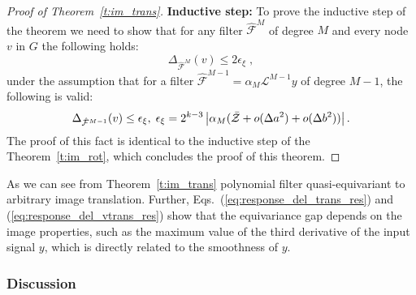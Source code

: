 \documentclass[10pt,journal,compsoc]{IEEEtran}
\newcommand{\renata}[1]{\textcolor{black}{#1}}
\newcommand{\hmF}{\hat{\mathcal{F}}}
\newcommand{\norm}[1]{\left|#1\right|}
\begin{document}
\begin{proof}[Proof of Theorem~\ref{t:im_trans}]
		\textbf{Inductive step:} %
		To prove the inductive step of the theorem we need to show that for any filter $\hmF^M$ of degree $M$ and every node $v$ in $G$ the following holds:
			\begin{equation}
			\Delta_{\hmF^M} (v) \leq 2\epsilon_\xi\;,
			\end{equation}
			\noindent
			under the assumption that for a filter $\hmF^{M-1} = \alpha_M \mathcal{L}^{M-1} y$ of degree $M-1$, the following is valid:
			\begin{equation}
			\small
			\Delta_{\hmF^{M-1}} (v) \leq \epsilon_\xi, \; \epsilon_\xi = 2^{k-3} \norm{\alpha_M (\bar{\mathcal{Z}} + o(\Delta a^2) + o(\Delta b^2))}.
			\end{equation}
			\noindent
			The proof of this fact is identical to the inductive step of the Theorem~\ref{t:im_rot}, which concludes the proof of this theorem.
		
	\end{proof}

	As we can see from Theorem~{\ref{t:im_trans}} polynomial filter quasi-equivariant to arbitrary image translation. Further, Eqs.~(\ref{eq:response_del_trans_res}) and (\ref{eq:response_del_vtrans_res}) show that the equivariance gap depends on the image properties, such as the maximum value of the third derivative of the input signal $y$, which is directly related to the smoothness of $y$. %
		
	\subsubsection{Discussion}
	\label{s:discussion}
	
\end{document}
